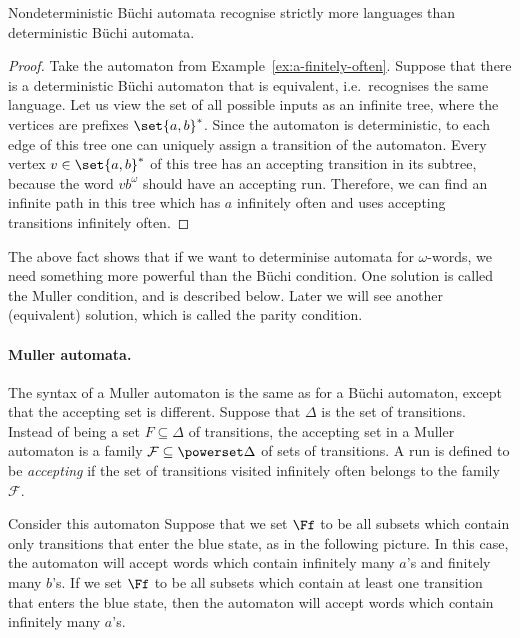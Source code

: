 \begin{fact}
Nondeterministic Büchi automata recognise strictly more languages than deterministic Büchi automata.	
\end{fact}
\begin{proof}
Take the automaton from Example~\ref{ex:a-finitely-often}.
  Suppose that there is a deterministic Büchi automaton that is equivalent, i.e.~recognises the same language. Let us view the set of all possible inputs as an infinite tree, where the vertices are prefixes $\set{a,b}^*$.  Since the automaton is deterministic, to each edge of this tree one can uniquely assign a transition of the automaton. Every vertex $v \in \set{a,b}^*$ of this tree has an accepting transition in its subtree,  because the word $vb^\omega$ should have an accepting run. Therefore, we can find an infinite path in this tree which  has $a$ infinitely often and uses accepting transitions infinitely often.	
\end{proof}




The above fact shows that if we want to determinise automata for $\omega$-words, we need something more powerful than the Büchi condition. One solution is called the Muller condition, and is described below. Later we will see another (equivalent) solution, which is called the parity condition.





\paragraph*{Muller automata.}
The syntax of a Muller automaton is the same as for a Büchi automaton, except that the accepting set is different. Suppose that $\Delta$ is the set of transitions. Instead of being a set $F \subseteq \Delta$ of transitions, the accepting set in a Muller automaton  is a family $\mathcal F \subseteq \powerset \Delta$ of sets of transitions. A run is defined to be \emph{accepting} if the set of transitions visited infinitely often belongs to the family $\mathcal F$. 

\begin{example}
	Consider this automaton 
	Suppose that we set $\Ff$ to be all subsets which contain only  transitions that  enter the blue state, as in the following picture.
	 In this case, the automaton will accept words which contain infinitely many $a$'s and finitely many $b$'s.	
	If we set $\Ff$ to be all subsets which contain at least one  transition that  enters the blue state, then the automaton will accept words which contain infinitely many $a$'s.	
\end{example}
%

